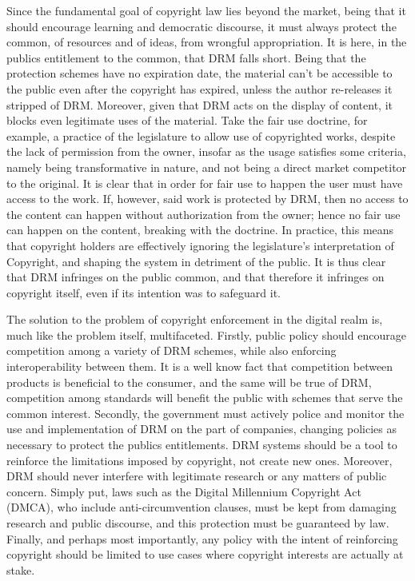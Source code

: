 \documentclass[12pt]{article}
\begin{document}
Since the fundamental goal of copyright law lies beyond the market, being that it should encourage learning and democratic discourse, it must always protect the common, of resources and of ideas, from wrongful appropriation. It is here, in the publics entitlement to the common, that DRM falls short. Being that the protection schemes have no expiration date, the material can't be accessible to the public even after the copyright has expired, unless the author re-releases it stripped of DRM. Moreover, given that DRM acts on the display of content, it blocks even legitimate uses of the material. Take the fair use doctrine, for example, a practice of the legislature to allow use of copyrighted works, despite the lack of permission from the owner, insofar as the usage satisfies some criteria, namely being transformative in nature, and not being a direct market competitor to the original. It is clear that in order for fair use to happen the user must have access to the work. If, however, said work is protected by DRM, then no access to the content can happen without authorization from the owner; hence no fair use can happen on the content, breaking with the doctrine. In practice, this means that copyright holders are effectively ignoring the legislature's interpretation of Copyright, and shaping the system in detriment of the public. It is thus clear that DRM infringes on the public common, and that therefore it infringes on copyright itself, even if its intention was to safeguard it.

The solution to the problem of copyright enforcement in the digital realm is, much like the problem itself, multifaceted. Firstly, public policy should encourage competition among a variety of DRM schemes, while also enforcing interoperability between them. It is a well know fact that competition between products is beneficial to the consumer, and the same will be true of DRM, competition among standards will benefit the public with schemes that serve the common interest. Secondly, the government must actively police and monitor the use and implementation of DRM on the part of companies, changing policies as necessary to protect the publics entitlements. DRM systems should be a tool to reinforce the limitations imposed by copyright, not create new ones. Moreover, DRM should never interfere with legitimate research or any matters of public concern. Simply put, laws such as the Digital Millennium Copyright Act (DMCA), who include anti-circumvention clauses, must be kept from damaging research and public discourse, and this protection must be guaranteed by law. Finally, and perhaps most importantly, any policy with the intent of reinforcing copyright should be limited to use cases where copyright interests are actually at stake\cite{felten}.
\end{document}
